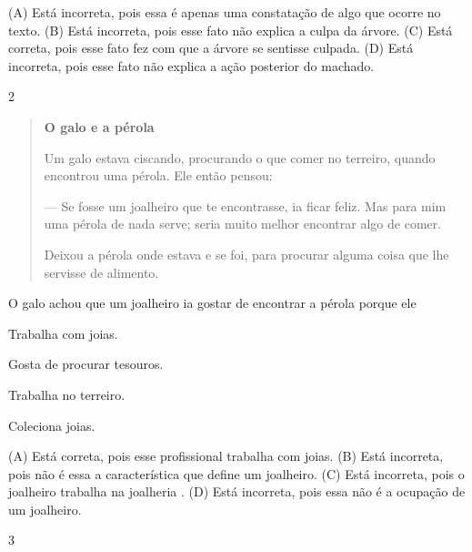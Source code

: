(A) Está incorreta, pois essa é apenas uma constatação de algo que ocorre no texto.
(B) Está incorreta, pois esse fato não explica a culpa da árvore.
(C) Está correta, pois esse fato fez com que a árvore se sentisse culpada.
(D) Está incorreta, pois esse fato não explica a ação posterior do machado.

\num{2}

\begin{quote}
\textbf{O galo e a pérola}

Um galo estava ciscando, procurando o que comer no terreiro,
quando encontrou uma pérola. Ele então pensou:

--- Se fosse um joalheiro que te encontrasse, ia ficar feliz.
Mas para mim uma pérola de nada serve; seria muito melhor
encontrar algo de comer.

Deixou a pérola onde estava e se foi, para procurar
alguma coisa que lhe servisse de alimento.
\end{quote}


O galo achou que um joalheiro ia gostar de encontrar a pérola porque ele

\begin{escolha}
\item Trabalha com joias.

\item Gosta de procurar tesouros.

\item Trabalha no terreiro.

\item Coleciona joias.
\end{escolha}


(A) Está correta, pois esse profissional trabalha com joias.
(B) Está incorreta, pois não é essa a característica que define um joalheiro.
(C) Está incorreta, pois o joalheiro trabalha na joalheria .
(D) Está incorreta, pois essa não é a ocupação de um joalheiro.

\num{3}


